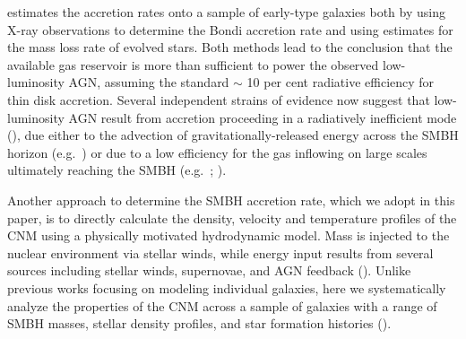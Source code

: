 \documentclass[usenatbib,fleqn]{mn2e}
\begin{document}
\citet{Ho:2009a} estimates the accretion rates onto a sample of
early-type galaxies both by using X-ray observations to determine the
Bondi accretion rate and using estimates for the mass loss rate of
evolved stars.  Both methods lead to the conclusion that the available
gas reservoir is more than sufficient to power the observed
low-luminosity AGN, assuming the standard $\sim$ 10 per cent radiative
efficiency for thin disk accretion.  Several independent strains of
evidence now suggest that low-luminosity AGN result from accretion
proceeding in a radiatively inefficient mode
(\citealt{Yuan&Narayan14}), due either to the advection of
gravitationally-released energy across the SMBH horizon
(e.g.~\citealt{Narayan&Yi95}) or due to a low efficiency for the gas
inflowing on large scales ultimately reaching the SMBH
(e.g.~\citealt{Blandford&Begelman99}; \citealt{Li+13}).


Another approach to determine the SMBH accretion rate, which we adopt
in this paper, is to directly calculate the density, velocity and
temperature profiles of the CNM using a physically motivated
hydrodynamic model.  Mass is injected to the nuclear environment via
stellar winds, while energy input results from several sources
including stellar winds, supernovae, and AGN feedback
(\citealt{Quataert:2004a,De-ColleGuillochon+:2012a,ShcherbakovWong+:2014a}).
Unlike previous works focusing on modeling individual galaxies, here
we systematically analyze the properties of the CNM across a sample of
galaxies with a range of SMBH masses, stellar density profiles, and
star formation histories (\citealt{WangMerritt:2004a}).
\end{document}
